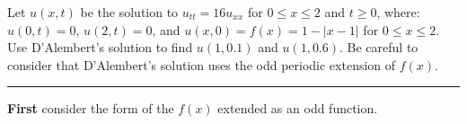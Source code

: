 \documentclass[10pt]{article}
\begin{document}
\noindent
Let $ \displaystyle u(x,t) $ be the solution to $ \displaystyle u_{tt} = 16u_{xx} $ 
for $ \displaystyle 0 \leq x \leq 2 $ and $ \displaystyle t \geq 0 $, 
where: $ \displaystyle u(0,t) = 0 $, $ u(2,t) = 0 $, and $ \displaystyle u(x,0) = f(x) = 1 - |x-1| $ 
for $ \displaystyle 0 \le x \le 2 $. Use D'Alembert's solution to find $ \displaystyle u(1,0.1) $ and $ \displaystyle u(1,0.6) $. 
Be careful to consider that D'Alembert's solution uses the odd periodic extension of $ \displaystyle f(x) $. \\
\vspace{2.5mm}

\hrule 

\vspace{7.5mm}

\noindent
\textbf{First} consider the form of the $ f(x) $ extended as an odd function. \\
\end{document}
